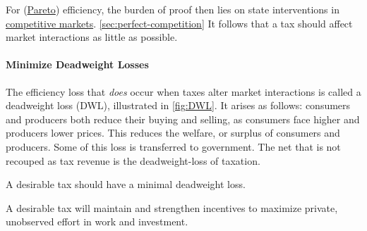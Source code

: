 For (\hyperref[sec:pareto]{Pareto}) efficiency, the burden of proof then lies on state interventions in \hyperref[sec:perfect-competition]{competitive markets}. \ref{sec:perfect-competition}
It follows that a tax should affect market interactions as little as possible.

\paragraph{Minimize Deadweight Losses}
The efficiency loss that \emph{does} occur when taxes alter market interactions is called a deadweight loss (DWL), illustrated in \autoref{fig:DWL}.
It arises as follows:
consumers and producers both reduce their buying and selling, as consumers face higher and producers lower prices.
This reduces the welfare, or surplus of consumers and producers.
Some of this loss is transferred to government.
The net that is not recouped as tax revenue is the deadweight-loss of taxation.


\begin{desideratum}
	A desirable tax should have a minimal deadweight loss.
	\label{des:minimal-DWL}
\end{desideratum}

\begin{desideratum}[Incentives]
	A desirable tax will maintain and strengthen incentives to maximize private, unobserved effort in work and investment.
	\label{des:Incentives}
\end{desideratum}


